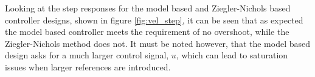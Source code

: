 \documentclass[../../main.tex]{subfiles}
\begin{document}

Looking at the step responses for the model based and Ziegler-Nichols based controller designs, shown in figure \ref{fig:vel_step}, it can be seen that as expected the model based controller meets the requirement of no overshoot, while the Ziegler-Nichols method does not. It must be noted however, that the model based design asks for a much larger control signal, $u$, which can lead to saturation issues when larger references are introduced.
\end{document}
